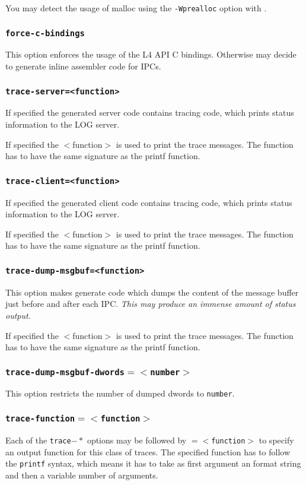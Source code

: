 You may detect the usage of malloc using the
\verb|-Wprealloc| option with \dice{}.


\subsubsection{{\tt force-c-bindings}}
This option enforces the usage of the L4 API C bindings. Otherwise \dice{}
may decide to generate inline assembler code for IPCs.

\subsubsection{{\tt trace-server=<function>}}
If specified the generated server code contains tracing code, which prints
status information to the LOG server.

If specified the $<$function$>$ is used to print the trace messages. The function
has to have the same signature as the printf function.

\subsubsection{{\tt trace-client=<function>}}
If specified the generated client code contains tracing code, which prints
status information to the LOG server.

If specified the $<$function$>$ is used to print the trace messages. The function
has to have the same signature as the printf function.

\subsubsection{{\tt trace-dump-msgbuf=<function>}}
This option makes \dice{} generate code which dumps the content of the message
buffer just before and after each IPC. {\it This may produce an immense amount
of status output.}

If specified the $<$function$>$ is used to print the trace messages. The function
has to have the same signature as the printf function.

\subsubsection{{\tt trace-dump-msgbuf-dwords$=<$number$>$}}
This option restricts the number of dumped dwords to {\tt number}.

\subsubsection{{\tt trace-function$=<$function$>$}}
Each of the {\tt trace$-*$} options may be followed by {\tt $=<$function$>$}
to specify an output function for this class of traces. The specified function
has to follow the \verb|printf| syntax, which means it has to take as first
argument an format string and then a variable number of arguments.


